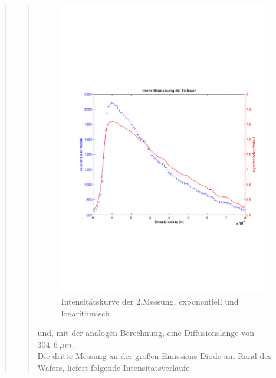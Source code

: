 \begin{quote}
\begin{quote}
        \begin{figure}[H]
                    \centering
                        \includegraphics[scale=0.53, trim = 1cm 6cm 1.5cm 8cm,
                        clip]{./Emissionsbilder/zwei/Intensitat_2.pdf}
                        \caption{Intensitätskurve der 2.Messung, exponentiell
                        und logarithmisch}
                            \label{fig:./Emissionsbilder/zwei/Intensitatsmessung.pdf}
        \end{figure}

        und, mit der analogen Berechnung, eine Diffusionslänge von $304,6\ \mu
        m$.\\

        Die dritte Messung an der großen Emissions-Diode am Rand des Wafers,
        liefert folgende Intensitätsverläufe


\end{quote}
\end{quote}
